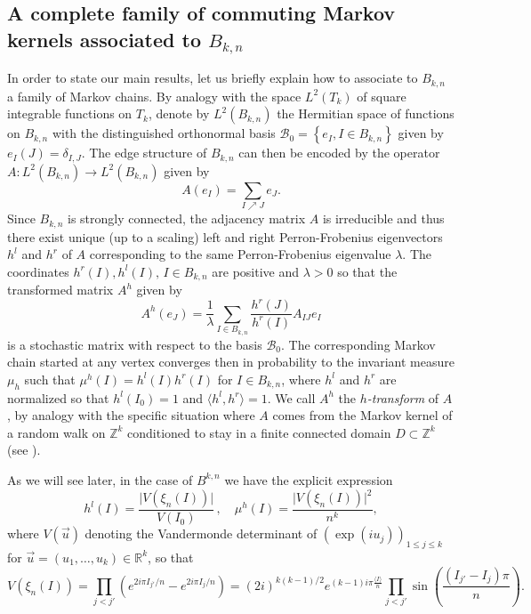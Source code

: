 \documentclass[10pt,11pt]{amsart}%
\begin{document}
\subsection{A complete family of commuting Markov kernels associated to $B_{k,n}$}
In order to state our main results, let us briefly explain how to associate to $B_{k,n}$ a family of Markov chains. By analogy with the space $L^2(T_k)$ of square integrable functions on $T_k$, denote by $L^2(B_{k,n})$ the Hermitian space of functions on $B_{k,n}$ with the distinguished orthonormal basis $\mathcal{B}_0=\left\{ e_{I}, I\in B_{k,n}\right\}$ given by $e_I(J)=\delta_{I,J}$. The edge structure of $B_{k,n}$ can then be encoded by the operator $A:L^2(B_{k,n})\rightarrow L^2(B_{k,n})$ given by 
$$A(e_I)=\sum_{I\nearrow J} e_{J}.$$
Since $B_{k,n}$ is strongly connected, the adjacency matrix $A$ is irreducible and thus there exist unique (up to a scaling) left and right Perron-Frobenius eigenvectors $h^l$ and $h^r$ of $A$ corresponding to the same Perron-Frobenius eigenvalue $\lambda$. The coordinates $h^r(I),h^l(I), \, I\in B_{k,n}$ are positive and $\lambda>0$ so that the transformed matrix $A^h$  given by
$$A^h(e_J)=\frac{1}{\lambda}\sum_{I\in B_{k,n}}\frac{h^r(J)}{h^r(I)}A_{IJ}e_{I}$$ 
is a stochastic matrix with respect to the basis $\mathcal{B}_0$. The corresponding Markov chain started at any vertex converges then in probability to the invariant measure $\mu_h$ such that $\mu^h(I)=h^l(I)h^r(I)$ for $I\in B_{k,n}$, where $h^l$ and $h^r$ are normalized so that $h^l(I_0)=1$ and  $\langle h^l,h^r\rangle=1$. We call $A^h$ the \textit{$h$-transform} of $A$, by analogy with the specific situation where $A$ comes from the Markov kernel of a random walk on $\mathbb{Z}^k$ conditioned to stay in a finite connected domain $D\subset \mathbb{Z}^k$ (see \cite{Do-87}).

As we will see later, in the case of $B^{k,n}$ we have the explicit expression
$$h^l(I)=\frac{\vert V(\xi_n(I))\vert}{V(I_0)}\,,\quad \mu^h(I)=\frac{\vert V(\xi_n(I))\vert^2}{n^k},$$
where $V(\vec{u})$ denoting the Vandermonde determinant of $(\exp(iu_j))_{1\leq j\leq k}$ for $\vec{u}=(u_1,\ldots,u_k)\in\mathbb{R}^k$, so that 
\begin{equation}\label{eq:definition_Vandermonde}
V(\xi_n(I))=\prod_{j<j'}\left(e^{2i\pi I_{j'}/n}-e^{2i\pi I_{j}/n}\right)=(2i)^{k(k-1)/2}e^{(k-1)i\pi\frac{\langle I\rangle}{n}}\prod_{j<j'}\sin\left(\frac{(I_{j'}-I_{j})\pi}{n}\right).
\end{equation}
\end{document}
